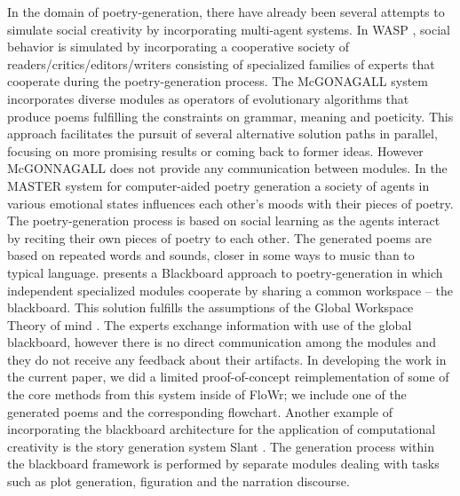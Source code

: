 In the domain of poetry-generation, there have already been several attempts to simulate social creativity by incorporating multi-agent systems. 
%
In WASP \cite{gervas10}, social behavior is simulated by incorporating a cooperative society of readers/critics/editors/writers consisting of specialized families of experts that cooperate during the poetry-generation process.
%
The McGONAGALL system \cite{manurung12} incorporates diverse modules as operators of evolutionary algorithms that produce poems fulfilling the constraints on grammar, meaning and poeticity.  This approach facilitates the pursuit of several alternative solution paths in parallel, focusing on more promising results or coming back to former ideas. However McGONNAGALL does not provide any communication between modules.
%
In the MASTER system for computer-aided poetry generation \cite{kirke13} a society of agents in various emotional states influences each other's moods with their pieces of poetry. The poetry-generation process is based on social learning as the agents interact by reciting their own pieces of poetry to each other. The generated poems are based on repeated words and sounds, closer in some ways to music than to typical language.
%
\cite{misztal2014poetry} presents a Blackboard approach to poetry-generation in which independent specialized modules cooperate by sharing a common workspace -- the blackboard. This solution fulfills the assumptions of  the Global Workspace Theory of mind  \cite{baars97}. The experts exchange information with use of the global blackboard, however there is no direct communication among the modules and they do not receive any feedback about their artifacts.  In developing the work in the current paper, we did a limited proof-of-concept reimplementation of some of the core methods from this system inside of FloWr; we include one of the generated poems and the corresponding flowchart.
%
Another example of incorporating the blackboard architecture for the application of computational creativity is the story generation system Slant \cite{slant13}. The generation process within the blackboard framework is performed by separate modules dealing with tasks such as plot generation, figuration and the narration discourse. 




